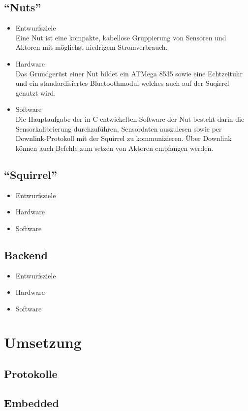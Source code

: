 \documentclass[12pt,a4paper]{article}
\begin{document}
\subsection{``Nuts''}
\begin{itemize}
	\item Entwurfsziele\\
	Eine Nut ist eine kompakte, kabellose Gruppierung von Sensoren und Aktoren mit möglichst niedrigem Stromverbrauch.
	\item Hardware\\
	Das Grundgerüst einer Nut bildet ein ATMega 8535 sowie eine Echtzeituhr und ein standardisiertes Bluetoothmodul welches auch auf der Suqirrel genutzt wird.
	\item Software\\
	Die Hauptaufgabe der in C entwickelten Software der Nut besteht darin die Sensorkalibrierung durchzuführen, Sensordaten auszulesen sowie per Downlink-Protokoll mit der Squirrel zu kommunizieren. Über Downlink können auch Befehle zum setzen von Aktoren empfangen werden.
\end{itemize}
\subsection{``Squirrel''}
\begin{itemize}
	\item Entwurfsziele
	\item Hardware
	\item Software
\end{itemize}
\subsection{Backend}
\begin{itemize}
	\item Entwurfsziele
	\item Hardware
	\item Software
\end{itemize}
\section{Umsetzung}
\subsection{Protokolle}
\subsection{Embedded}
\end{document}
